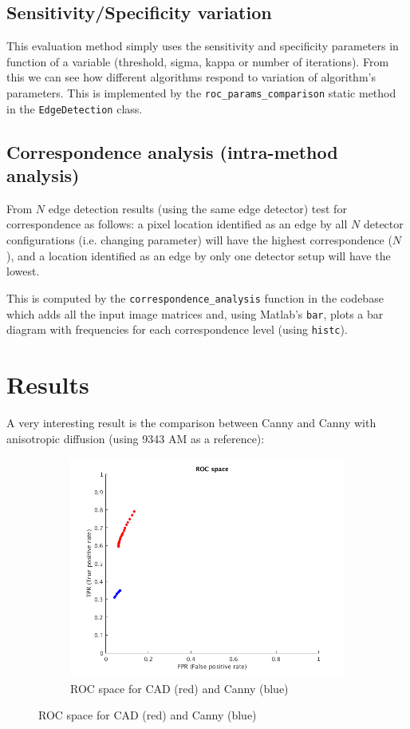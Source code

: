 \documentclass{article}
\begin{document}
	\subsection*{Sensitivity/Specificity variation}	
	
	This evaluation method simply uses the sensitivity and specificity parameters in function
	of a variable (threshold, sigma, kappa or number of iterations). From this we
	can see how different algorithms respond to variation of algorithm's parameters.
	This is implemented by the \verb|roc_params_comparison| static method in the
	\verb|EdgeDetection| class.
	
	\subsection*{Correspondence analysis (intra-method analysis)}	
	
	From $N$ edge detection results (using the same edge detector) test for
	correspondence as follows: a pixel location identified as an edge by
	all $N$ detector configurations (i.e. changing parameter)
	will have the highest correspondence ($N$), and a
	location identified as an edge by only one detector setup will have the lowest.
	
	This is computed by the \verb|correspondence_analysis| function in the codebase which
	adds all the input image matrices and, using Matlab's \verb|bar|, plots a bar diagram
	with frequencies for each correspondence level (using \verb|histc|).
	
	\section{Results}
	
	A very interesting result is the comparison between Canny and Canny with anisotropic diffusion (using 9343 AM as a reference):	
	
\begin{figure}[H]
\centering
\begin{subfigure}{.5\textwidth}
  \centering
  \includegraphics[width=.6\linewidth]{x9343AM/comparison.png}
  \caption{ROC space for CAD (red) and Canny (blue)}
  \label{fig:sub1}
\end{subfigure}
\label{fig:roc_space}
\end{figure}
	
\end{document}
